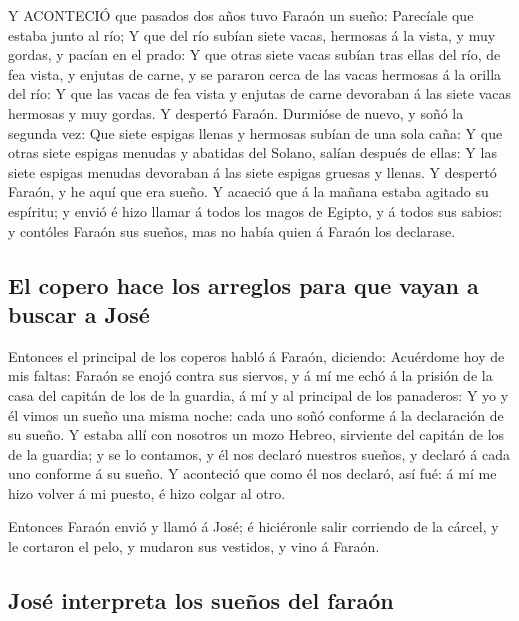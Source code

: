  Y ACONTECIÓ que pasados dos años tuvo Faraón un sueño:
Parecíale que estaba junto al río;  Y que del río subían
siete vacas, hermosas á la vista, y muy gordas, y pacían en el prado:
 Y que otras siete vacas subían tras ellas del río, de fea
vista, y enjutas de carne, y se pararon cerca de las vacas hermosas á la
orilla del río:  Y que las vacas de fea vista y enjutas de
carne devoraban á las siete vacas hermosas y muy gordas. Y despertó
Faraón.  Durmióse de nuevo, y soñó la segunda vez: Que siete
espigas llenas y hermosas subían de una sola caña:  Y que
otras siete espigas menudas y abatidas del Solano, salían después de
ellas:  Y las siete espigas menudas devoraban á las siete
espigas gruesas y llenas. Y despertó Faraón, y he aquí que era sueño.
 Y acaeció que á la mañana estaba agitado su espíritu; y
envió é hizo llamar á todos los magos de Egipto, y á todos sus sabios: y
contóles Faraón sus sueños, mas no había quien á Faraón los declarase.

\hypertarget{el-copero-hace-los-arreglos-para-que-vayan-a-buscar-a-josuxe9}{%
\subsection{El copero hace los arreglos para que vayan a buscar a
José}\label{el-copero-hace-los-arreglos-para-que-vayan-a-buscar-a-josuxe9}}

 Entonces el principal de los coperos habló á Faraón,
diciendo: Acuérdome hoy de mis faltas:  Faraón se enojó
contra sus siervos, y á mí me echó á la prisión de la casa del capitán
de los de la guardia, á mí y al principal de los panaderos:
 Y yo y él vimos un sueño una misma noche: cada uno soñó
conforme á la declaración de su sueño.  Y estaba allí con
nosotros un mozo Hebreo, sirviente del capitán de los de la guardia; y
se lo contamos, y él nos declaró nuestros sueños, y declaró á cada uno
conforme á su sueño.  Y aconteció que como él nos declaró,
así fué: á mí me hizo volver á mi puesto, é hizo colgar al otro.

 Entonces Faraón envió y llamó á José; é hiciéronle salir
corriendo de la cárcel, y le cortaron el pelo, y mudaron sus vestidos, y
vino á Faraón.

\hypertarget{josuxe9-interpreta-los-sueuxf1os-del-farauxf3n}{%
\subsection{José interpreta los sueños del
faraón}\label{josuxe9-interpreta-los-sueuxf1os-del-farauxf3n}}

